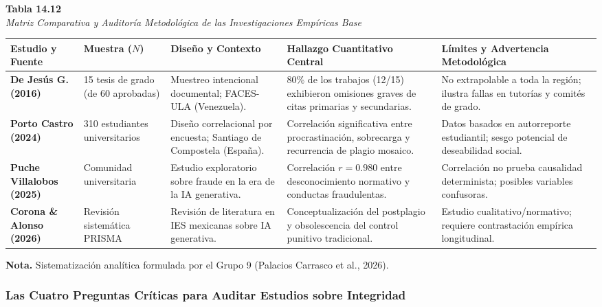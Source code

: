 \begin{table}[htbp]
\centering
\small
\renewcommand{\arraystretch}{1.25}
\textbf{Tabla 14.12}\\[0.15cm]
\textit{Matriz Comparativa y Auditoría Metodológica de las Investigaciones Empíricas Base}\\[0.25cm]
\begin{tabularx}{\textwidth}{p{2.6cm}p{2.0cm}p{3.2cm}X p{3.0cm}}
\toprule
\textbf{Estudio y Fuente} & \textbf{Muestra ($N$)} & \textbf{Diseño y Contexto} & \textbf{Hallazgo Cuantitativo Central} & \textbf{Límites y Advertencia Metodológica} \\
\midrule
\textbf{De Jesús G. (2016)} & 15 tesis de grado (de 60 aprobadas) & Muestreo intencional documental; FACES-ULA (Venezuela). & 80\% de los trabajos (12/15) exhibieron omisiones graves de citas primarias y secundarias. & No extrapolable a toda la región; ilustra fallas en tutorías y comités de grado. \\
\textbf{Porto Castro (2024)} & 310 estudiantes universitarios & Diseño correlacional por encuesta; Santiago de Compostela (España). & Correlación significativa entre procrastinación, sobrecarga y recurrencia de plagio mosaico. & Datos basados en autorreporte estudiantil; sesgo potencial de deseabilidad social. \\
\textbf{Puche Villalobos (2025)} & Comunidad universitaria & Estudio exploratorio sobre fraude en la era de la IA generativa. & Correlación $r = 0.980$ entre desconocimiento normativo y conductas fraudulentas. & Correlación no prueba causalidad determinista; posibles variables confusoras. \\
\textbf{Corona \& Alonso (2026)} & Revisión sistemática PRISMA & Revisión de literatura en IES mexicanas sobre IA generativa. & Conceptualización del postplagio y obsolescencia del control punitivo tradicional. & Estudio cualitativo/normativo; requiere contrastación empírica longitudinal. \\
\bottomrule
\end{tabularx}
\vspace{0.15cm}
\raggedright \scriptsize \textbf{Nota.} Sistematización analítica formulada por el Grupo 9 (Palacios Carrasco et al., 2026).
\end{table}

\subsubsection{Las Cuatro Preguntas Críticas para Auditar Estudios sobre Integridad}

